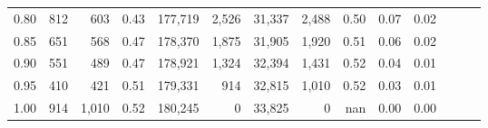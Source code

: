 \begin{tabular}{rrrrrrrrrrrrrr}
0.80 &     812 &    603 &  0.43 &  177,719 &    2,526 &  31,337 &   2,488 &  0.50 &  0.07 &      0.02 \\
0.85 &     651 &    568 &  0.47 &  178,370 &    1,875 &  31,905 &   1,920 &  0.51 &  0.06 &      0.02 \\
0.90 &     551 &    489 &  0.47 &  178,921 &    1,324 &  32,394 &   1,431 &  0.52 &  0.04 &      0.01 \\
0.95 &     410 &    421 &  0.51 &  179,331 &      914 &  32,815 &   1,010 &  0.52 &  0.03 &      0.01 \\
1.00 &     914 &  1,010 &  0.52 &  180,245 &        0 &  33,825 &       0 &   nan &  0.00 &      0.00 \\
\bottomrule
\end{tabular}
